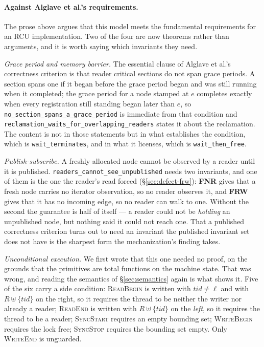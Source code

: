 \paragraph{Against Alglave et al.'s requirements.}
\label{sec:alglave}
The prose above argues that this model meets the fundamental requirements for an
RCU implementation.  Two of the four are now theorems rather than arguments, and
it is worth saying which invariants they need.

\emph{Grace period and memory barrier.}  The essential clause of Alglave et
al.'s correctness criterion is that reader critical sections do not span grace
periods.  A section spans one if it began before the grace period began and was
still running when it completed; the grace period for a node stamped at $e$
completes exactly when every registration still standing began later than $e$,
so \texttt{no\_section\_spans\_a\_grace\_period} is immediate from that
condition and \texttt{reclamation\_waits\_for\_overlapping\_readers} states it
about the reclamation.  The content is not in those statements but in what
establishes the condition, which is \texttt{wait\_terminates}, and in what it
licenses, which is \texttt{wait\_then\_free}.

\emph{Publish-subscribe.}  A freshly allocated node cannot be observed by a
reader until it is published.  \texttt{readers\_cannot\_see\_unpublished} needs
two invariants, and one of them is the one the reader's read forced
(\S\ref{sec:defect-frw}): \textbf{FNR} gives that a fresh node carries no
iterator observation, so no reader observes it, and \textbf{FRW} gives that it
has no incoming edge, so no reader can walk to one.  Without the second the
guarantee is half of itself --- a reader could not be \emph{holding} an
unpublished node, but nothing said it could not reach one.  That a published
correctness criterion turns out to need an invariant the published invariant set
does not have is the sharpest form the mechanization's finding takes.

\emph{Unconditional execution.}  We first wrote that this one needed no proof,
on the grounds that the primitives are total functions on the machine state.
That was wrong, and reading the semantics of \S\ref{sec:semantics} again is what
shows it.  Five of the six carry a side condition: \textsc{ReadBegin} is written
with $\mathit{tid} \neq \ell$ and with $R \uplus \{\mathit{tid}\}$ on the right,
so it requires the thread to be neither the writer nor already a reader;
\textsc{ReadEnd} is written with $R \uplus \{\mathit{tid}\}$ on the \emph{left},
so it requires the thread to be a reader; \textsc{SyncStart} requires an empty
bounding set; \textsc{WriteBegin} requires the lock free; \textsc{SyncStop}
requires the bounding set empty.  Only \textsc{WriteEnd} is unguarded.

